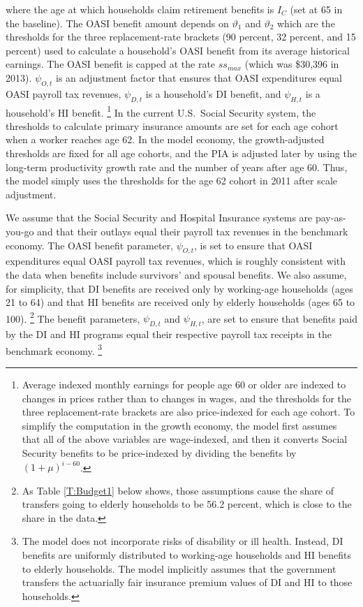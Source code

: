 \documentclass[11pt,leqno,fleqn]{article}
\begin{document}
where the age at which households claim retirement benefits is $I_C$ (set at 65 in the baseline). The OASI benefit amount depends on $\vartheta_{1}$ and $\vartheta_{2}$ which are the thresholds for the three replacement-rate brackets (90 percent, 32 percent, and 15 percent) used to calculate a household's OASI benefit from its average historical earnings. The OASI benefit is capped at the rate $ss_{max}$ (which was \$30,396 in 2013). $\psi_{O,t}$ is an adjustment factor that ensures that OASI expenditures equal OASI payroll tax revenues, $\psi_{D,t}$ is a household's DI benefit, and $\psi_{H,t}$ is a household's HI benefit.%
\footnote{Average indexed monthly earnings for people age 60 or older are indexed to changes in prices rather than to changes in wages, and the thresholds for the three replacement-rate brackets are also price-indexed for each age cohort. To simplify the computation in the growth economy, the model first assumes that all of the above variables are wage-indexed, and then it converts Social Security benefits to be price-indexed by dividing the benefits by $(1+\mu)^{i-60}$.}
In the current U.S.\ Social Security system, the thresholds to calculate primary insurance amounts are set for each age cohort when a worker reaches age 62. In the model economy, the growth-adjusted thresholds are fixed for all age cohorts, and the PIA is adjusted later by using the long-term productivity growth rate and the number of years after age 60. Thus, the model simply uses the thresholds for the age 62 cohort in 2011 after scale adjustment.

We assume that the Social Security and Hospital Insurance systems are pay-as-you-go and that their outlays equal their payroll tax revenues in the benchmark economy. The OASI benefit parameter, $\psi_{O,t}$, is set to ensure that OASI expenditures equal OASI payroll tax revenues, which is roughly consistent with the data when benefits include survivors' and spousal benefits. We also assume, for simplicity, that DI benefits are received only by working-age households (ages 21 to 64) and that HI benefits are received only by elderly households (ages 65 to 100).%
\footnote{As Table \ref{T:Budget1} below shows, those assumptions cause the share of transfers going to elderly households to be 56.2 percent, which is close to the share in the data.}
The benefit parameters, $\psi_{D,t}$ and $\psi_{H,t}$, are set to ensure that benefits paid by the DI and HI programs equal their respective payroll tax receipts in the benchmark economy.%
\footnote{The model does not incorporate risks of disability or ill health. Instead, DI benefits are uniformly distributed to working-age households and HI benefits to elderly households. The model implicitly assumes that the government transfers the actuarially fair insurance premium values of DI and HI to those households.}
\end{document}

